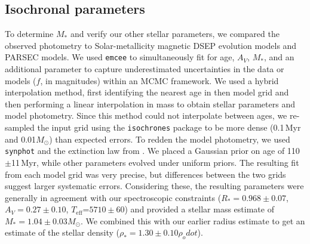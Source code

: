 \documentclass[twocolumn]{aastex631}
\newcommand{\teff}{\ensuremath{T_{\text{eff}}}}
\begin{document}
\subsection{Isochronal parameters}\label{sec:isochrone}
To determine $M_*$ and verify our other stellar parameters, we compared the observed photometry to Solar-metallicity magnetic DSEP evolution models and PARSEC models. We used \texttt{emcee} to simultaneously fit for age, $A_V$, $M_*$, and an additional parameter to capture underestimated uncertainties in the data or models ($f$, in magnitudes) within an MCMC framework. We used a hybrid interpolation method, first identifying the nearest age in then model grid and then performing a linear interpolation in mass to obtain stellar parameters and model photometry. Since this method could not interpolate between ages, we re-sampled the input grid using the \texttt{isochrones} package \citep{2015ascl.soft03010M} to be more dense (0.1\,Myr and 0.01$M_\odot$) than expected errors. To redden the model photometry, we used \texttt{synphot} \citep{pey_lian_lim_2020_3971036} and the extinction law from \citet{1989ApJ...345..245C}. We placed a Gaussian prior on age of 110$\pm$11\,Myr, while other parameters evolved under uniform priors. The resulting fit from each model grid was very precise, but differences between the two grids suggest larger systematic errors. Considering these, the resulting parameters were generally in agreement with our spectroscopic constraints ($R_*=0.968\pm0.07$, $A_V=0.27\pm0.10$, \teff=$5710\pm60$) and provided a stellar mass estimate of $M_*=1.04\pm0.03M_\odot$. We combined this with our earlier radius estimate to get an estimate of the stellar density ($\rho_*=1.30\pm0.10\rho_odot$).
\end{document}
